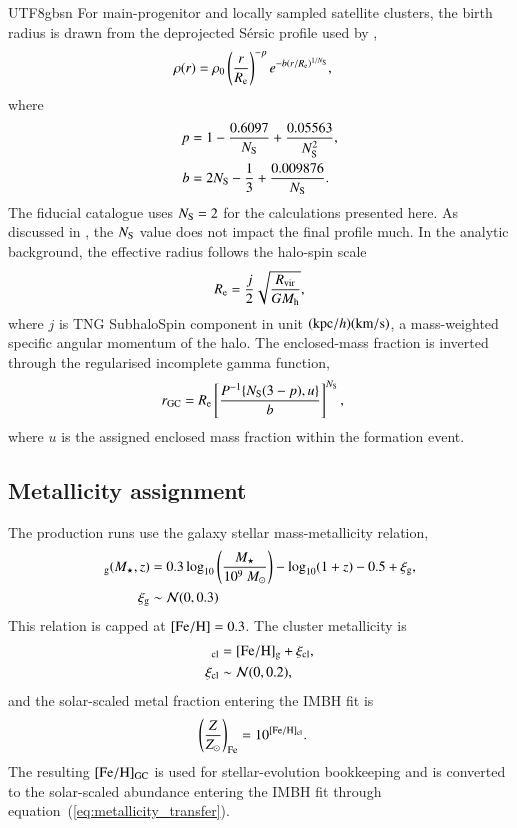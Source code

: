 \documentclass[trackchanges, twocolappendix, twocolumn]{aastex701}
\begin{document}
\begin{CJK*}{UTF8}{gbsn}
For main-progenitor and locally sampled satellite clusters, the birth radius is drawn from the deprojected S{\'e}rsic profile used by \cite{Gao+2024GC},
\begin{align}
\rho(r) & = \rho_0 \left(\dfrac{r}{R_{\rm e}}\right)^{-p}
e^{-b\left(r / R_{\rm e}\right)^{1 / N_{\rm S}}},
\label{eq:sersic_density}
\end{align}
where
\begin{align}
p & = 1 - \dfrac{0.6097}{N_{\rm S}} + \dfrac{0.05563}{N_{\rm S}^2}, \\
b & = 2 N_{\rm S} - \dfrac{1}{3} + \dfrac{0.009876}{N_{\rm S}}.
\end{align}
The fiducial catalogue uses $N_{\rm S} = 2$ for the calculations presented here. As discussed in \cite{Gao+2024GC}, the $N_{\rm S}$ value does not impact the final profile much. In the analytic background, the effective radius follows the halo-spin scale \citep{Gao+2024GC}
\begin{align}
R_{\rm e} = \dfrac{j}{2} \sqrt{\dfrac{R_{\rm vir}}{G M_{\rm h}}} ,
\label{eq:R_e}
\end{align}
where $j$ is TNG SubhaloSpin component in unit $({\rm kpc} / h) (\rm km/s)$, a mass-weighted specific angular momentum of the halo. The enclosed-mass fraction is inverted through the regularised incomplete gamma function,
\begin{align}
r_{\rm GC} & = R_{\rm e}
\left[\dfrac{P^{-1}\{N_{\rm S}(3-p),u\}}{b}\right]^{N_{\rm S}},
\end{align}
where $u$ is the assigned enclosed mass fraction within the formation event.

\subsection{Metallicity assignment}
\label{subsubsect:metallicity_assignment}

The production runs use the \cite{Chen&Gnedin2024aGC} galaxy stellar mass-metallicity relation,
\begin{align}
[{\rm Fe / H}]_{\rm g} (M_\star, z) & = 0.3 \log_{10} \left( \dfrac{M_\star}{10^9~M_\odot} \right) - \log_{10} (1 + z) - 0.5 + \xi_{\rm g}, \\
\xi_{\rm g} & \sim {\cal N} (0, 0.3)
\label{eq:mass-metal}
\end{align}
This relation is capped at $[{\rm Fe / H}] = 0.3$. The cluster metallicity is
\begin{align}
[{\rm Fe / H}]_{\rm cl} & =[{\rm Fe / H}]_{\rm g} + \xi_{\rm cl} , \\
\xi_{\rm cl} & \sim {\cal N} (0, 0.2),
\end{align}
and the solar-scaled metal fraction entering the IMBH fit is
\begin{align}
\left( \dfrac{Z}{Z_{\odot}} \right)_{\rm Fe} & = 10^{[{\rm Fe / H}]_{\rm cl}} .
\label{eq:metallicity_transfer}
\end{align}
The resulting $[\mathrm{Fe}/\mathrm{H}]_{\rm GC}$ is used for stellar-evolution bookkeeping and is converted to the solar-scaled abundance entering the IMBH fit through equation~(\ref{eq:metallicity_transfer}).


\end{CJK*}
\end{document}
